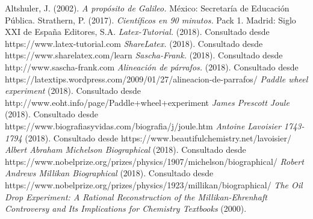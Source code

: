\documentclass[letterpaper, 10pt, journal]{IEEEtran}
\begin{document}
\begin{thebibliography}{1}
\bibitem{[1]} Altshuler, J. (2002). \emph{A propósito de Galileo.} México: Secretaría de Educación Pública.
\bibitem{[2]} Strathern, P. (2017). \emph{Científicos en 90 minutos.} Pack 1. Madrid: Siglo XXI de España Editores, S.A. 
 \emph{Latex-Tutorial.} (2018). Consultado desde https://www.latex-tutorial.com
 \emph{ShareLatex.} (2018). Consultado desde https://www.sharelatex.com/learn
 \emph{Sascha-Frank.} (2018). Consultado desde http://www.sascha-frank.com
\bibitem{[7]} \emph{Alineación de párrafos.} (2018). Consultado desde https://latextips.wordpress.com/2009/01/27/alineacion-de-parrafos/
 \emph{Paddle wheel experiment} (2018). Consultado desde http://www.eoht.info/page/Paddle+wheel+experiment
 \emph{James Prescott Joule} (2018). Consultado desde 
https://www.biografiasyvidas.com/biografia/j/joule.htm
 \emph{Antoine Lavoisier 1743-1794} (2018). Consultado desde https://www.beautifulchemistry.net/lavoisier/
 \emph{Albert Abraham Michelson Biographical} (2018). Consultado desde https://www.nobelprize.org/prizes/physics/1907/michelson/biographical/
 \emph{Robert Andrews Millikan Biographical} (2018). Consultado desde https://www.nobelprize.org/prizes/physics/1923/millikan/biographical/
 \emph{The Oil Drop Experiment: A Rational Reconstruction of the Millikan-Ehrenhaft Controversy and Its Implications for Chemistry Textbooks} (2000).
\end{thebibliography}
\end{document}
